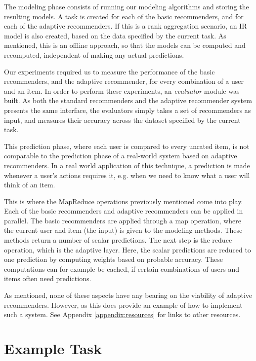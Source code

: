 The modeling phase consists of running our modeling algorithms and storing the resulting models.
A task is created for each of the basic recommenders, and for each of the adaptive recommenders.
If this is a rank aggregation scenario, an IR model is also created, based on the data
specified by the current task.
As mentioned, this is an offline approach, so that the models can be computed and recomputed,
independent of making any actual predictions.

Our experiments required us to measure the performance of the
basic recommenders, and the adaptive recommender, for every combination of 
a user and an item.
In order to perform these experiments, an \emph{evaluator} module was built.
As both the standard recommenders and the adaptive recommender system presents the same 
interface, the evaluators simply takes a set of recommenders as input, 
and measures their accuracy across the dataset specified by the current task.

This prediction phase, where each user is compared to every unrated item,
is not comparable to the prediction phase of a real-world system
based on adaptive recommenders. In a real world application of this technique,
a prediction is made whenever a user's actions requires it,
e.g. when we need to know what a user will think of an item.

This is where the $\mathrm{MapReduce}$ operations previously mentioned come into play.
Each of the basic recommenders and adaptive recommenders can be applied in parallel.
The basic recommenders are applied through a $\mathrm{map}$ operation, where the current user and item (the input)
is given to the modeling methods. These methods return a number of scalar predictions.
The next step is the $\mathrm{reduce}$ operation, which is the adaptive layer.
Here, the scalar predictions are reduced to one prediction by computing weights
based on probable accuracy.
These computations can for example be cached, if certain combinations of users and items
often need predictions.

As mentioned, none of these aspects have any bearing on the viability of adaptive recommenders.
However, as this does provide an example of how to implement such a system. 
See Appendix \ref{appendix:resources} for links to other resources. 


\section{Example Task}

